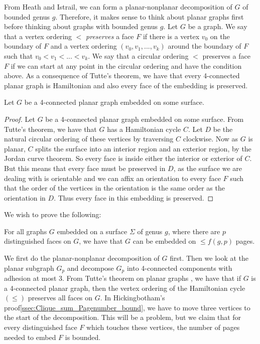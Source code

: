 From Heath and Istrail\cite{heathPagenumberGenusGraphs1992}, we can form a planar-nonplanar decomposition of $G$ of bounded genus $g$. Therefore, it makes sense to think about planar graphs first before thinking about graphs with bounded genus $g$.
Let $G$ be a graph. We say that a vertex ordering $<$ \textit{preserves} a face $F$ if there is a vertex $v_0$ on the boundary of $F$ and a vertex ordering $(v_0, v_1, ..., v_k)$ around the boundary of $F$ such that $v_0 < v_1 < ... < v_k$. We say that a circular ordering $<$ preserves a face $F$ if we can start at any point in the circular ordering and have the condition above. 
As a consequence of Tutte's theorem, we have that every 4-connected planar graph is Hamiltonian and also every face of the embedding is preserved.
\begin{theorem}
	Let $G$ be a 4-connected planar graph embedded on some surface. 
\end{theorem}

\begin{proof}
	Let $G$ be a 4-connected planar graph embedded on some surface. From Tutte's theorem, we have that $G$ has a Hamiltonian cycle $C$. Let $D$ be the natural circular ordering of these vertices by traversing $C$ clockwise. Now as $G$ is planar, $C$ splits the surface into an interior region and an exterior region, by the Jordan curve theorem. So every face is inside either the interior or exterior of $C$. But this means that every face must be preserved in $D$, as the surface we are dealing with is orientable and we can affix an orientation to every face $F$ such that the order of the vertices in the orientation is the same order as the orientation in $D$. Thus every face in this embedding is preserved. 
	
\end{proof}

We wish to prove the following:

\begin{conjecture}\label{conj:4-planar graphs}
	For all graphs $G$ embedded on a surface $\Sigma$ of genus $g$, where there are $p$ distinguished faces on $G$, we have that $G$ can be embedded on $\leq f(g, p)$ pages.
\end{conjecture}
We first do the planar-nonplanar decomposition of $G$ first. 
Then we look at the planar subgraph $G_p$ and decompose $G_p$ into 4-connected components with adhesion at most 3.
From Tutte's theorem on planar graphs \cite{tutteTheoremPlanarGraphs1956}, we have that if $G$ is a 4-connected planar graph, then the vertex ordering of the Hamiltonian cycle $(\leq)$ preserves all faces on $G$.
In Hickingbotham's proof\cref{ssec:Clique_sum_Pagenumber_bound}, we have to move three vertices to the start of the decomposition. This will be a problem, but we claim that for every distinguished face $F$ which touches these vertices, the number of pages needed to embed $F$ is bounded. 

